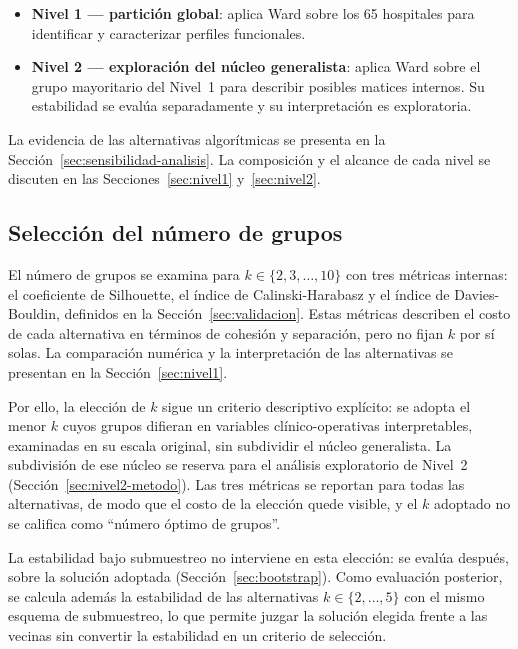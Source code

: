 \begin{itemize}
  \item \textbf{Nivel 1 — partición global}: aplica Ward sobre los 65 hospitales
    para identificar y caracterizar perfiles funcionales.
  \item \textbf{Nivel 2 — exploración del núcleo generalista}: aplica Ward sobre
    el grupo mayoritario del Nivel~1 para describir posibles matices internos.
    Su estabilidad se evalúa separadamente y su interpretación es exploratoria.
\end{itemize}

La evidencia de las alternativas algorítmicas se presenta en la
Sección~\ref{sec:sensibilidad-analisis}. La composición y el alcance de cada
nivel se discuten en las Secciones~\ref{sec:nivel1} y~\ref{sec:nivel2}.

\subsection{Selección del número de grupos}
\label{sec:seleccion-k}

El número de grupos se examina para $k \in \{2, 3, \ldots, 10\}$ con tres
métricas internas: el coeficiente de Silhouette, el índice de Calinski-Harabasz
y el índice de Davies-Bouldin, definidos en la Sección~\ref{sec:validacion}.
Estas métricas describen el costo de cada alternativa en términos de cohesión y
separación, pero no fijan $k$ por sí solas. La comparación numérica y la interpretación de las alternativas se presentan
en la Sección~\ref{sec:nivel1}.

Por ello, la elección de $k$ sigue un criterio descriptivo explícito:
se adopta el menor $k$ cuyos grupos difieran en variables clínico-operativas
interpretables, examinadas en su escala original, sin subdividir el núcleo
generalista. La subdivisión de ese núcleo se reserva para el análisis
exploratorio de Nivel~2 (Sección~\ref{sec:nivel2-metodo}). Las tres métricas se
reportan para todas las alternativas, de modo que el costo de la elección quede
visible, y el $k$ adoptado no se califica como ``número óptimo de grupos''.

La estabilidad bajo submuestreo no interviene en esta elección: se evalúa
después, sobre la solución adoptada (Sección~\ref{sec:bootstrap}). Como
evaluación posterior, se calcula además la estabilidad de las alternativas
$k \in \{2, \ldots, 5\}$ con el mismo esquema de submuestreo, lo que permite
juzgar la solución elegida frente a las vecinas sin convertir la estabilidad
en un criterio de selección.

